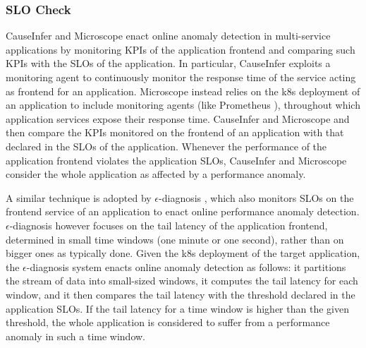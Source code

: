 \subsubsection{SLO Check}
\label{sec:detection:monitoring:slo-check}
CauseInfer \cite{40_Chen2020_CauseInfer,48_Chen2014_CauseInfer} and Microscope \cite{06_Lin2018_Microscope,19_Guan2019_MicroscopeDemo} enact online anomaly detection in multi-service applications by monitoring KPIs of the application frontend and comparing such KPIs with the SLOs of the application.
In particular, CauseInfer \cite{40_Chen2020_CauseInfer,48_Chen2014_CauseInfer} exploits a monitoring agent to continuously monitor the response time of the service acting as frontend for an application.
Microscope \cite{06_Lin2018_Microscope,19_Guan2019_MicroscopeDemo} instead relies on the k8s deployment of an application to include monitoring agents (like Prometheus \cite{Prometheus}), throughout which application services expose their response time.
CauseInfer \cite{40_Chen2020_CauseInfer,48_Chen2014_CauseInfer} and Microscope \cite{06_Lin2018_Microscope} and then compare the KPIs monitored on the frontend of an application with that declared in the SLOs of the application. 
Whenever the performance of the application frontend violates the application SLOs, CauseInfer \cite{40_Chen2020_CauseInfer,48_Chen2014_CauseInfer} and Microscope \cite{06_Lin2018_Microscope,19_Guan2019_MicroscopeDemo} consider the whole application as affected by a performance anomaly.


A similar technique is adopted by $\epsilon$-diagnosis \cite{49_Shan2019_epsilonDiagnosis}, which also monitors SLOs on the frontend service of an application to enact online performance anomaly detection.
$\epsilon$-diagnosis \cite{49_Shan2019_epsilonDiagnosis} however focuses on the tail latency of the application frontend, determined in small time windows (\eg one minute or one second), rather than on bigger ones as typically done. 
Given the k8s deployment of the target application, the $\epsilon$-diagnosis system \cite{49_Shan2019_epsilonDiagnosis} enacts online anomaly detection as follows: it partitions the stream of data into small-sized windows, it computes the tail latency for each window, and it then compares the tail latency with the threshold declared in the application SLOs.
If the tail latency for a time window is higher than the given threshold, the whole application is considered to suffer from a performance anomaly in such a time window.

